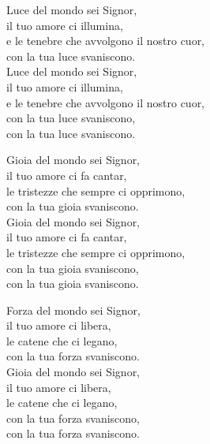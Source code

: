 
\strofa Luce del mondo sei Signor,\\
il tuo amore ci illumina,\\
e le tenebre che avvolgono il nostro cuor,\\
con la tua luce svaniscono.\\
Luce del mondo sei Signor,\\
il tuo amore ci illumina,\\
e le tenebre che avvolgono il nostro cuor,\\
con la tua luce svaniscono,\\
con la tua luce svaniscono.

\spazio


\spazio

\strofa Gioia del mondo sei Signor,\\
il tuo amore ci fa cantar,\\
le tristezze che sempre ci opprimono,\\
con la tua gioia svaniscono.\\
Gioia del mondo sei Signor,\\
il tuo amore ci fa cantar,\\
le tristezze che sempre ci opprimono,\\
con la tua gioia svaniscono,\\
con la tua gioia svaniscono.

\spazio


\spazio

\strofa Forza del mondo sei Signor,\\
il tuo amore ci libera,\\
le catene che ci legano,\\
con la tua forza svaniscono.\\
Gioia del mondo sei Signor,\\
il tuo amore ci libera,\\
le catene che ci legano,\\
con la tua forza svaniscono,\\
con la tua forza svaniscono.

